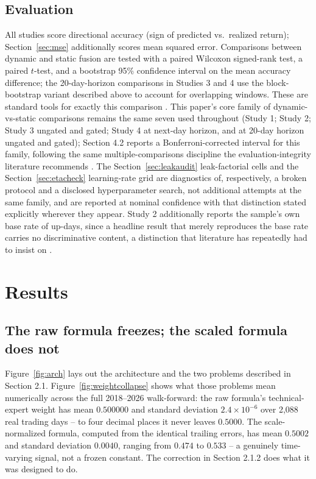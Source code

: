 \documentclass[10pt,a4paper,twocolumn]{article}
\begin{document}
\subsection{Evaluation}

All studies score directional accuracy (sign of predicted vs.\ realized return); Section~\ref{sec:mse} additionally scores mean squared error. Comparisons between dynamic and static fusion are tested with a paired Wilcoxon signed-rank test, a paired $t$-test, and a bootstrap 95\% confidence interval on the mean accuracy difference; the 20-day-horizon comparisons in Studies 3 and 4 use the block-bootstrap variant described above to account for overlapping windows. These are standard tools for exactly this comparison \cite{dieboldmariano1995}. This paper's core family of dynamic-vs-static comparisons remains the same seven used throughout (Study 1; Study 2; Study 3 ungated and gated; Study 4 at next-day horizon, and at 20-day horizon ungated and gated); Section 4.2 reports a Bonferroni-corrected interval for this family, following the same multiple-comparisons discipline the evaluation-integrity literature recommends \cite{harvey2016}. The Section~\ref{sec:leakaudit} leak-factorial cells and the Section~\ref{sec:etacheck} learning-rate grid are diagnostics of, respectively, a broken protocol and a disclosed hyperparameter search, not additional attempts at the same family, and are reported at nominal confidence with that distinction stated explicitly wherever they appear. Study 2 additionally reports the sample's own base rate of up-days, since a headline result that merely reproduces the base rate carries no discriminative content, a distinction that literature has repeatedly had to insist on \cite{lopezdeprado2018,bailey2014,harvey2016}.

\section{Results}

\subsection{The raw formula freezes; the scaled formula does not}

Figure~\ref{fig:arch} lays out the architecture and the two problems described in Section 2.1. Figure~\ref{fig:weightcollapse} shows what those problems mean numerically across the full 2018--2026 walk-forward: the raw formula's technical-expert weight has mean $0.500000$ and standard deviation $2.4\times10^{-6}$ over 2,088 real trading days -- to four decimal places it never leaves $0.5000$. The scale-normalized formula, computed from the identical trailing errors, has mean $0.5002$ and standard deviation $0.0040$, ranging from $0.474$ to $0.533$ -- a genuinely time-varying signal, not a frozen constant. The correction in Section 2.1.2 does what it was designed to do.
\end{document}
